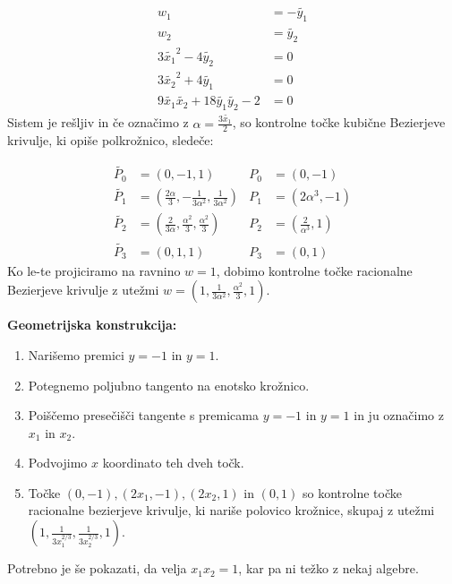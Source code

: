 \documentclass[a4paper,12pt]{article}
\begin{document}
\begin{align*}
w_{1} &= - \tilde{y_{1}} \\
w_{2} &= \tilde{y_{2}} \\
3\tilde{x_{1}}^2 - 4 \tilde{y_{2}} &= 0 \\
3 \tilde{x_{2}}^2 + 4 \tilde{y_{1}} &= 0 \\
9 \tilde{x_{1}} \tilde{x_{2}} + 18 \tilde{y_{1}} \tilde{y_{2}} - 2 &= 0
\end{align*}
Sistem je rešljiv in če označimo z  $\alpha = \frac{3\tilde{x_{1}}}{2}$, so kontrolne točke kubične Bezierjeve krivulje, ki opiše polkrožnico, sledeče:

\begin{align*}
\tilde{P_{0}} &= (0,-1,1)  & P_{0} &= (0,-1) \\
\tilde{P_{1}} &= (\frac{2\alpha}{3},-\frac{1}{3\alpha^2},\frac{1}{3\alpha^2}) & P_{1} &= (2\alpha^3, -1) \\
\tilde{P_{2}} &= (\frac{2}{3\alpha},\frac{\alpha^2}{3}, \frac{\alpha^2}{3}) & P_{2} &= (\frac{2}{\alpha^3}, 1) \\ 
\tilde{P_{3}} &= (0, 1,1) & P_{3} &= (0, 1)
\end{align*}
Ko le-te projiciramo na ravnino $w=1$, dobimo kontrolne točke racionalne Bezierjeve krivulje z utežmi $w = (1, \frac{1}{3\alpha^2}, \frac{\alpha^2}{3}, 1)$.
\medskip

\noindent
\newpage
\textbf{Geometrijska konstrukcija:}
\begin{enumerate}
\item Narišemo premici $y=-1$ in $y=1$.
\item Potegnemo poljubno tangento na enotsko krožnico.
\item Poiščemo presečišči tangente s premicama $y=-1$ in $y=1$ in ju označimo z $x_{1}$ in $x_{2}$.
\item Podvojimo $x$ koordinato teh dveh točk.
\item Točke $(0,-1), (2x_{1}, -1), (2x_{2}, 1)$ in $(0,1)$ so kontrolne točke racionalne bezierjeve krivulje, ki nariše polovico krožnice, skupaj z utežmi $(1, \frac{1}{3x_{1}^{2/3}}, \frac{1}{3x_{2}^{2/3}}, 1)$.
\end{enumerate}

Potrebno je še pokazati, da velja $x_{1}x_{2}=1$, kar pa ni težko z nekaj algebre.
\end{document}
